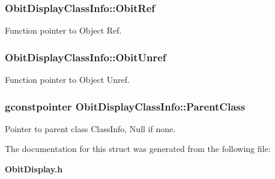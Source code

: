 \subsubsection{ {\bf Obit\-Display\-Class\-Info::Obit\-Ref}}\label{structObitDisplayClassInfo_o10}


Function pointer to Object Ref. 

\subsubsection{ {\bf Obit\-Display\-Class\-Info::Obit\-Unref}}\label{structObitDisplayClassInfo_o11}


Function pointer to Object Unref. 

\subsubsection{\setlength{\rightskip}{0pt plus 5cm}gconstpointer {\bf Obit\-Display\-Class\-Info::Parent\-Class}}\label{structObitDisplayClassInfo_o3}


Pointer to parent class Class\-Info, Null if none. 



The documentation for this struct was generated from the following file:\begin{CompactItemize}
\item 
{\bf Obit\-Display.h}\end{CompactItemize}
